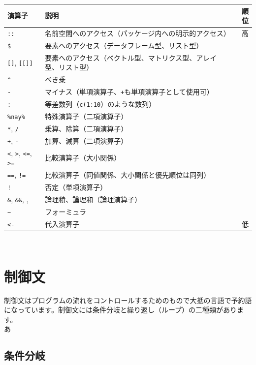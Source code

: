 \documentclass[
  12pt,
]{book}
\begin{document}
\begin{longtable}[]{@{}llr@{}}
\toprule
演算子 & 説明 & 順位 \\
\midrule
\endhead
\texttt{::} & 名前空間へのアクセス（パッケージ内への明示的アクセス） & 高 \\
\texttt{\$} & 要素へのアクセス（データフレーム型、リスト型） & \\
\texttt{{[}{]}}, \texttt{{[}{[}{]}{]}} & 要素へのアクセス（ベクトル型、マトリクス型、アレイ型、リスト型） & \\
\texttt{\^{}} & べき乗 & \\
\texttt{-} & マイナス（単項演算子、\texttt{+}も単項演算子として使用可） & \\
\texttt{:} & 等差数列（\texttt{c(1:10}）のような数列） & \\
\texttt{\%nay\%} & 特殊演算子（二項演算子） & \\
\texttt{*}, \texttt{/} & 乗算、除算（二項演算子） & \\
\texttt{+}, \texttt{-} & 加算、減算（二項演算子） & \\
\texttt{\textless{}}, \texttt{\textgreater{}}, \texttt{\textless{}=}, \texttt{\textgreater{}=} & 比較演算子（大小関係） & \\
\texttt{==}, \texttt{!=} & 比較演算子（同値関係、大小関係と優先順位は同列） & \\
\texttt{!} & 否定（単項演算子） & \\
\texttt{\&}, \texttt{\&\&}, \texttt{\textbar{}}, \texttt{\textbar{}\textbar{}} & 論理積、論理和（論理演算子） & \\
\texttt{\textasciitilde{}} & フォーミュラ & \\
\texttt{\textless{}-} & 代入演算子 & 低 \\
\bottomrule
\end{longtable}

　

\hypertarget{ux5236ux5fa1ux6587}{%
\section{制御文}\label{ux5236ux5fa1ux6587}}

制御文はプログラムの流れをコントロールするためのもので大抵の言語で予約語になっています。制御文には条件分岐と繰り返し（ループ）の二種類があります。\\
あ

\hypertarget{ux6761ux4ef6ux5206ux5c90}{%
\subsection{条件分岐}\label{ux6761ux4ef6ux5206ux5c90}}
\end{document}
